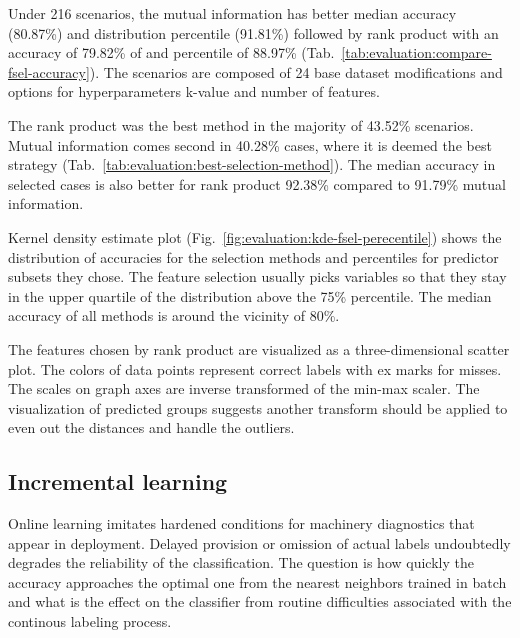 Under 216 scenarios, the mutual information has better median accuracy (80.87\%) and distribution percentile (91.81\%) followed by rank product with an accuracy of 79.82\% of and percentile of 88.97\% (Tab.~\ref{tab:evaluation:compare-fsel-accuracy}). The scenarios are composed of 24 base dataset modifications and options for hyperparameters k-value and number of features. 

The rank product was the best method in the majority of 43.52\% scenarios. Mutual information comes second in 40.28\% cases, where it is deemed the best strategy (Tab.~\ref{tab:evaluation:best-selection-method}). The median accuracy in selected cases is also better for rank product 92.38\% compared to 91.79\% mutual information. 

Kernel density estimate plot (Fig.~\ref{fig:evaluation:kde-fsel-perecentile}) shows the distribution of accuracies for the selection methods and percentiles for predictor subsets they chose. The feature selection usually picks variables so that they stay in the upper quartile of the distribution above the 75\% percentile. The median accuracy of all methods is around the vicinity of 80\%.

The features chosen by rank product are visualized as a three-dimensional scatter plot. The colors of data points represent correct labels with ex marks for misses. The scales on graph axes are inverse transformed of the min-max scaler. The visualization of predicted groups suggests another transform should be applied to even out the distances and handle the outliers.


\subsection{Incremental learning}
Online learning imitates hardened conditions for machinery diagnostics that appear in deployment. Delayed provision or omission of actual labels undoubtedly degrades the reliability of the classification. The question is how quickly the accuracy approaches the optimal one from the nearest neighbors trained in batch and what is the effect on the classifier from routine difficulties associated with the continous labeling process.

